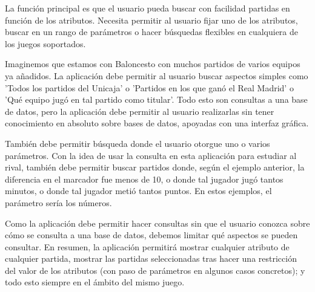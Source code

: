 La función principal es que el usuario pueda buscar con facilidad partidas en función de los atributos. Necesita permitir al usuario fijar uno de los atributos, buscar en un rango de parámetros o hacer búsquedas flexibles en cualquiera de los juegos soportados.

Imaginemos que estamos con Baloncesto con muchos partidos de varios equipos ya añadidos. La aplicación debe permitir al usuario buscar aspectos simples como 'Todos los partidos del Unicaja' o 'Partidos en los que ganó el Real Madrid' o 'Qué equipo jugó en tal partido como titular'. Todo esto son consultas a una base de datos, pero la aplicación debe permitir al usuario realizarlas sin tener conocimiento en absoluto sobre bases de datos, apoyadas con una interfaz gráfica. 

También debe permitir búsqueda donde el usuario otorgue uno o varios parámetros. Con la idea de usar la consulta en esta aplicación para estudiar al rival, también debe permitir buscar partidos donde, según el ejemplo anterior, la diferencia en el marcador fue menos de 10, o donde tal jugador jugó tantos minutos, o donde tal jugador metió tantos puntos. En estos ejemplos, el parámetro sería los números.

Como la aplicación debe permitir hacer consultas sin que el usuario conozca sobre cómo se consulta a una base de datos, debemos limitar qué aspectos se pueden consultar. En resumen, la aplicación permitirá mostrar cualquier atributo de cualquier partida, mostrar las partidas seleccionadas tras hacer una restricción del valor de los atributos (con paso de parámetros en algunos casos concretos); y todo esto siempre en el ámbito del mismo juego.